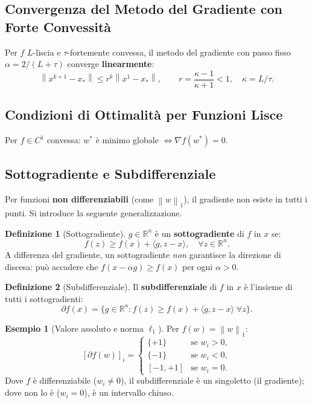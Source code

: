 \documentclass[11pt,a4paper]{article}
\theoremstyle{definition}
\newtheorem{definition}{Definizione}[section]
\newtheorem{example}{Esempio}[section]
\theoremstyle{plain}
\theoremstyle{remark}
\newcommand{\R}{\mathbb{R}}
\newcommand{\norm}[1]{\left\| #1 \right\|}
\newcommand{\grad}{\nabla}
\newcommand{\subgr}{\partial}
\begin{document}
\subsection{Convergenza del Metodo del Gradiente con Forte Convessità}

Per $f$ $L$-liscia e $\tau$-fortemente convessa, il metodo del gradiente con passo fisso
$\alpha = 2/(L+\tau)$ converge \textbf{linearmente}:
\[
  \norm{x^{k+1} - x_*} \leq r^k \norm{x^1 - x_*},
  \qquad r = \frac{\kappa - 1}{\kappa + 1} < 1, \quad \kappa = L/\tau.
\]

\subsection{Condizioni di Ottimalità per Funzioni Lisce}

Per $f \in C^1$ convessa: $w^*$ è minimo globale $\iff \grad f(w^*) = 0$.

\subsection{Sottogradiente e Subdifferenziale}

Per funzioni \textbf{non differenziabili} (come $\norm{w}_1$), il gradiente non esiste in tutti i punti.
Si introduce la seguente generalizzazione.

\begin{definition}[Sottogradiente]
  $g \in \R^n$ è un \textbf{sottogradiente} di $f$ in $x$ se:
  \[
    f(z) \geq f(x) + \langle g, z-x\rangle, \quad \forall z \in \R^n.
  \]
  A differenza del gradiente, un sottogradiente \emph{non} garantisce la direzione di discesa:
  può accadere che $f(x - \alpha g) \geq f(x)$ per ogni $\alpha > 0$.
\end{definition}

\begin{definition}[Subdifferenziale]
  Il \textbf{subdifferenziale} di $f$ in $x$ è l'insieme di tutti i sottogradienti:
  \[
    \subgr f(x) = \bigl\{ g \in \R^n : f(z) \geq f(x) + \langle g, z-x\rangle \;\forall z \bigr\}.
  \]
\end{definition}

\begin{example}[Valore assoluto e norma $\ell_1$]
  Per $f(w) = \norm{w}_1$:
  \[
    [\subgr f(w)]_i =
    \begin{cases}
      \{+1\}  & \text{se } w_i > 0, \\
      \{-1\}  & \text{se } w_i < 0, \\
      [-1,+1] & \text{se } w_i = 0.
    \end{cases}
  \]
  Dove $f$ è differenziabile ($w_i \neq 0$), il subdifferenziale è un singoletto (il gradiente);
  dove non lo è ($w_i = 0$), è un intervallo chiuso.
\end{example}
\end{document}
